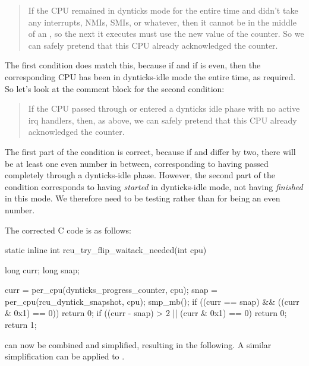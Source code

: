 \begin{quote}
	If the CPU remained in dynticks mode for the entire time
	and didn't take any interrupts, NMIs, SMIs, or whatever,
	then it cannot be in the middle of an , so
	the next  it executes must use the new value
	of the counter.
	So we can safely pretend that this CPU already acknowledged
	the counter.
\end{quote}

The first condition does match this, because if 
and if  is even, then the corresponding CPU has been
in dynticks-idle mode the entire time, as required.
So let's look at the comment block for the second condition:

\begin{quote}
	If the CPU passed through or entered a dynticks idle phase with
	no active irq handlers, then, as above, we can safely pretend
	that this CPU already acknowledged the counter.
\end{quote}

The first part of the condition is correct, because if 
and  differ by two, there will be at least one even
number in between, corresponding to having passed completely through
a dynticks-idle phase.
However, the second part of the condition corresponds to having
\emph{started} in dynticks-idle mode, not having \emph{finished}
in this mode.
We therefore need to be testing  rather than
 for being an even number.

The corrected C code is as follows:

\begin{fcvlabel}
\begin{VerbatimN}[commandchars=\\\[\]]
static inline int
rcu_try_flip_waitack_needed(int cpu)
{
	long curr;
	long snap;

	curr = per_cpu(dynticks_progress_counter, cpu);
	snap = per_cpu(rcu_dyntick_snapshot, cpu);
	smp_mb();
	if ((curr == snap) && ((curr & 0x1) == 0)) \lnlbl[if:b]
		return 0;
	if ((curr - snap) > 2 || (curr & 0x1) == 0)
		return 0;			\lnlbl[if:e]
	return 1;
}
\end{VerbatimN}
\end{fcvlabel}

\begin{fcvref}
 can now be combined and simplified,
resulting in the following.
A similar simplification can be applied to
.
\end{fcvref}

